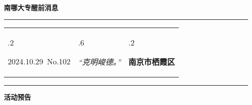 \documentclass[letterpaper, 12pt]{article}
\begin{document}
\begin{center}
    \Huge\textbf{南哪大专醒前消息}
\end{center}
\vspace{4mm}
\hrule
\renewcommand\tabularxcolumn[1]{m{#1}}
\begin{tabularx}{\textwidth}{>{\hsize.2\hsize}X>{\hsize.6\hsize}X>{\hsize.2\hsize}X}
    \begin{flushleft}
        2024.10.29\, No.102
    \end{flushleft}
    &
    \begin{center}
        \textit{“克明峻德。”}
    \end{center}
    &
    \begin{flushright}
        \textbf{南京市栖霞区}
    \end{flushright}
\end{tabularx}
\vspace{-3.5mm}
\hrule
\vspace{4mm}
\centerline{\huge\textbf{活动预告}}
\end{document}
